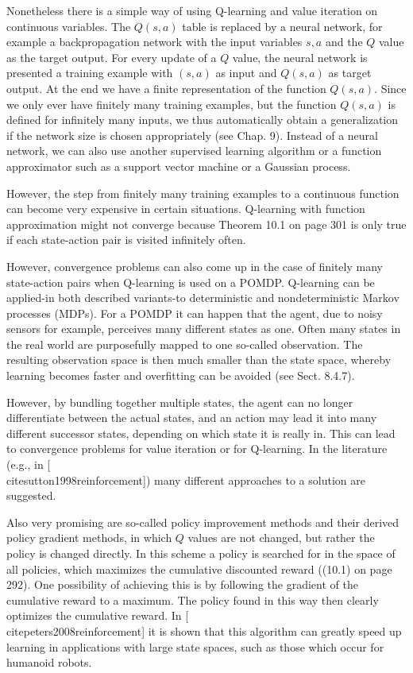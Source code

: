 \documentclass[10pt]{book}
\begin{document}
Nonetheless there is a simple way of using Q-learning and value iteration on continuous variables. The $Q(s, a)$ table is replaced by a neural network, for example a backpropagation network with the input variables $s, a$ and the $Q$ value as the target output. For every update of a $Q$ value, the neural network is presented a training example with $(s, a)$ as input and $Q(s, a)$ as target output. At the end we have a finite representation of the function $Q(s, a)$. Since we only ever have finitely many training examples, but the function $Q(s, a)$ is defined for infinitely many inputs, we thus automatically obtain a generalization if the network size is chosen appropriately (see Chap. 9). Instead of a neural network, we can also use another supervised learning algorithm or a function approximator such as a support vector machine or a Gaussian process.

However, the step from finitely many training examples to a continuous function can become very expensive in certain situations. Q-learning with function approximation might not converge because Theorem 10.1 on page 301 is only true if each state-action pair is visited infinitely often.

However, convergence problems can also come up in the case of finitely many state-action pairs when Q-learning is used on a POMDP. Q-learning can be applied-in both described variants-to deterministic and nondeterministic Markov processes (MDPs). For a POMDP it can happen that the agent, due to noisy sensors for example, perceives many different states as one. Often many states in the real world are purposefully mapped to one so-called observation. The resulting observation space is then much smaller than the state space, whereby learning becomes faster and overfitting can be avoided (see Sect. 8.4.7).

However, by bundling together multiple states, the agent can no longer differentiate between the actual states, and an action may lead it into many different successor states, depending on which state it is really in. This can lead to convergence problems for value iteration or for Q-learning. In the literature (e.g., in [\\cite{sutton1998reinforcement}]) many different approaches to a solution are suggested.

Also very promising are so-called policy improvement methods and their derived policy gradient methods, in which $Q$ values are not changed, but rather the policy is changed directly. In this scheme a policy is searched for in the space of all policies, which maximizes the cumulative discounted reward ((10.1) on page 292). One possibility of achieving this is by following the gradient of the cumulative reward to a maximum. The policy found in this way then clearly optimizes the cumulative reward. In [\\cite{peters2008reinforcement}] it is shown that this algorithm can greatly speed up learning in applications with large state spaces, such as those which occur for humanoid robots.
\end{document}
